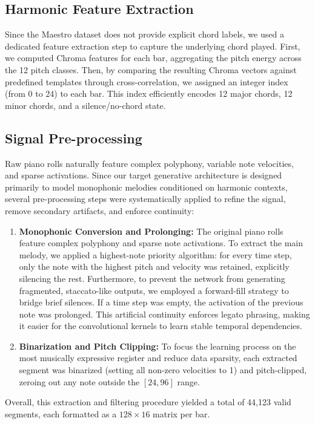 \subsection{Harmonic Feature Extraction}
Since the Maestro dataset does not provide explicit chord labels, we used a dedicated feature extraction step to capture the underlying chord played.
First, we computed Chroma features for each bar, aggregating the pitch energy across the 12 pitch classes.
Then, by comparing the resulting Chroma vectors against predefined templates through cross-correlation, we assigned an integer index (from 0 to 24) to each bar.
This index efficiently encodes 12 major chords, 12 minor chords, and a silence/no-chord state.

\subsection{Signal Pre-processing}
Raw piano rolls naturally feature complex polyphony, variable note velocities, and sparse activations.
Since our target generative architecture is designed primarily to model monophonic melodies conditioned on harmonic contexts, several pre-processing steps were systematically applied to refine the signal, remove secondary artifacts, and enforce continuity:
\begin{enumerate}
    \item \textbf{Monophonic Conversion and Prolonging:} The original piano rolls feature complex polyphony and sparse note activations. To extract the main melody, we applied a highest-note priority algorithm: for every time step, only the note with the highest pitch and velocity was retained, explicitly silencing the rest. Furthermore, to prevent the network from generating fragmented, staccato-like outputs, we employed a forward-fill strategy to bridge brief silences. If a time step was empty, the activation of the previous note was prolonged. This artificial continuity enforces legato phrasing, making it easier for the convolutional kernels to learn stable temporal dependencies.

    \item \textbf{Binarization and Pitch Clipping:} To focus the learning process on the most musically expressive register and reduce data sparsity, each extracted segment was binarized (setting all non-zero velocities to 1) and pitch-clipped, zeroing out any note outside the $[24, 96]$ range.
\end{enumerate}

Overall, this extraction and filtering procedure yielded a total of 44,123 valid segments, each formatted as a $128 \times 16$ matrix per bar.

